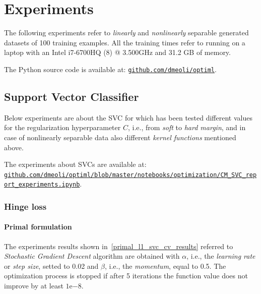 \section{Experiments}

The following experiments refer to \emph{linearly} and \emph{nonlinearly} separable generated datasets of 100 training examples. All the training times refer to running on a laptop with an Intel i7-6700HQ (8) @ 3.500GHz and 31.2 GB of memory.

The Python source code is available at: \href{https://github.com/dmeoli/optiml}{\texttt{github.com/dmeoli/optiml}}.

\subsection{Support Vector Classifier}

Below experiments are about the SVC for which has been tested different values for the regularization hyperparameter $C$, i.e., from \emph{soft} to \emph{hard margin}, and in case of nonlinearly separable data also different \emph{kernel functions} mentioned above.

The experiments about SVCs are available at: \\ \href{https://github.com/dmeoli/optiml/blob/master/notebooks/optimization/CM_SVC_report_experiments.ipynb}{\texttt{github.com/dmeoli/optiml/blob/master/notebooks/optimization/CM\_SVC\_report\_experiments.ipynb}}.

\subsubsection{Hinge loss}

\paragraph{Primal formulation}

The experiments results shown in~\ref{primal_l1_svc_cv_results} referred to \emph{Stochastic Gradient Descent} algorithm are obtained with $\alpha$, i.e., the \emph{learning rate} or \emph{step size}, setted to 0.02 and $\beta$, i.e., the \emph{momentum}, equal to 0.5. The optimization process is stopped if after 5 iterations the function value does not improve by at least $1\mathrm{e}{-8}$.



